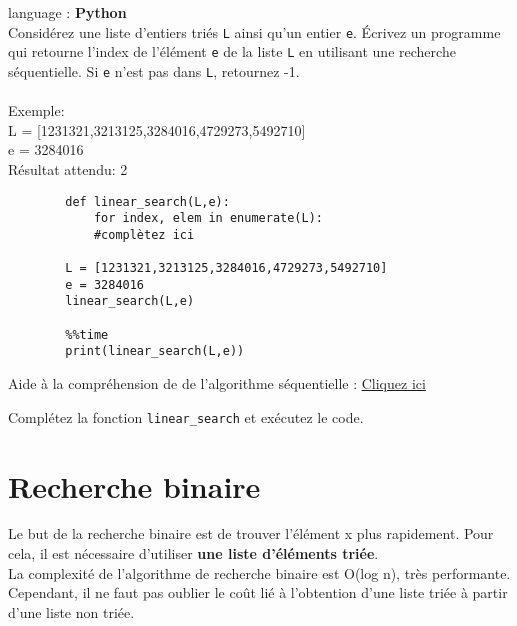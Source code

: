 \begin{Exercice}[5 minutes] language : \textbf{Python}\\

    Considérez une liste d’entiers triés \lstinline{L} ainsi qu’un entier \lstinline{e}. Écrivez un programme qui retourne l'index de l'élément \lstinline{e} de la liste \lstinline{L} en utilisant une recherche séquentielle. Si \lstinline{e} n’est pas dans \lstinline{L}, retournez -1.\\\\
    
    Exemple:\\
    L = [1231321,3213125,3284016,4729273,5492710]\\
    e = 3284016\\
    Résultat attendu: 2\\
  
    \begin{lstlisting}
        def linear_search(L,e):
            for index, elem in enumerate(L):
            #complètez ici 
            
        L = [1231321,3213125,3284016,4729273,5492710]
        e = 3284016
        linear_search(L,e)
        
        %%time
        print(linear_search(L,e))
    \end{lstlisting}

    \begin{conseil}
        Aide à la compréhension de de l'algorithme séquentielle : \href{https://runestone.academy/runestone/books/published/pythonds/SortSearch/TheSequentialSearch.html#lst-seqsearchpython}{Cliquez ici}
    \end{conseil}
    \begin{solution}
        Complétez la fonction \lstinline{linear_search} et exécutez le code. 
    \end{solution}

\end{Exercice}

\newpage
\section{Recherche binaire}
Le but de la recherche binaire est de trouver l'élément x plus rapidement. Pour cela, il est nécessaire d'utiliser \textbf{une liste d'éléments triée}.\\

La complexité de l'algorithme de recherche binaire est O(log n), très performante. Cependant, il ne faut pas oublier le coût lié à l'obtention d'une liste triée à partir d'une liste non triée.\\

